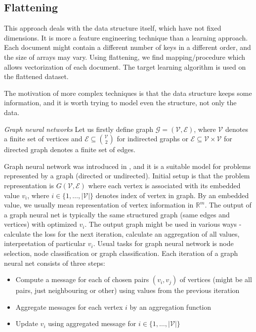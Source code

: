 \subsection{Flattening}
This approach deals with the data structure itself, which have not fixed dimensions. It is more a feature engineering technique than a learning approach. Each document might contain a different number of keys in a different order, and the size of arrays may vary. Using flattening, we find mapping/procedure which allows vectorization of each document. The target learning algorithm is used on the flattened dataset.

The motivation of more complex techniques is that the data structure keeps some information, and it is worth trying to model even the structure, not only the data.

\emph{Graph neural networks}
Let us firstly define graph $\mathcal{G}=(\mathcal{V},\mathcal{E})$, where $\mathcal{V}$ denotes a finite set of vertices and $\mathcal{E}\subseteq\binom{\mathcal{V}}{2}$ for indirected graphs or $\mathcal{E}\subseteq\mathcal{V}\times\mathcal{V}$ for directed graph denotes a finite set of edges. 

Graph neural network was introduced in \cite{Scarselli2009}, and it is a suitable model for problems represented by a graph (directed or undirected). Initial setup is that the problem representation is $G(\mathcal{V},\mathcal{E})$ where each vertex is associated with its embedded value $v_i$, where $i\in\{1,\dots,|\mathcal{V}|\}$ denotes index of vertex in graph. By an embedded value, we usually mean representation of vertex information in $\mathbb{R}^m$. The output of a graph neural net is typically the same structured graph (same edges and vertices) with optimized $v_i$. The output graph might be used in various ways - calculate the loss for the next iteration, calculate an aggregation of all values, interpretation of particular $v_i$. Usual tasks for graph neural network is node selection, node classification or graph classification. Each iteration of a graph neural net consists of three steps:
\begin{itemize}
    \item Compute a message for each of chosen pairs $(v_i,v_j)$ of vertices (might be all pairs, just neighbouring or other) using values from the previous iteration
    \item Aggregate messages for each vertex $i$ by an aggregation function
    \item Update $v_i$ using aggregated message for $i\in\{1,\dots,|\mathcal{V}|\}$
\end{itemize}

